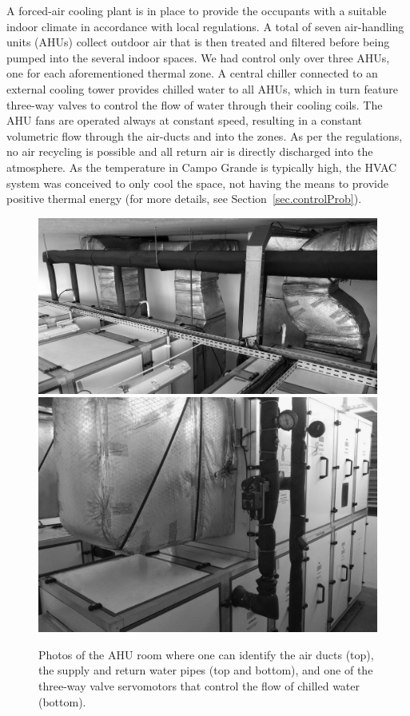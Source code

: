 A forced-air cooling plant is in place to provide the occupants with a suitable indoor climate in accordance with local regulations. A total of seven air-handling units (AHUs) collect outdoor air that is then treated and filtered before being pumped into the several indoor spaces. We had control only over three AHUs, one for each aforementioned thermal zone. A central chiller connected to an external cooling tower provides chilled water to all AHUs, which in turn feature three-way valves to control the flow of water through their cooling coils. The AHU fans are operated always at constant speed, resulting in a constant volumetric flow through the air-ducts and into the zones. As per the regulations, no air recycling is possible and all return air is directly discharged into the atmosphere. As the temperature in Campo Grande is typically high, the HVAC system was conceived to only cool the space, not having the means to provide positive thermal energy (for more details, see Section~\ref{sec.controlProb}).

\begin{figure}[!t]
	\centering
	\includegraphics[width=0.75\linewidth]{../images/chap3_ahus_b.jpg} \\[8pt]
	\includegraphics[width=0.75\linewidth]{../images/chap3_ahus_a.jpg} 
	\caption{Photos of the AHU room where one can identify the air ducts (top), the supply and return water pipes (top and bottom), and one of the three-way valve servomotors that control the flow of chilled water (bottom).}
	\label{fig.ahuRoom}
\end{figure}

